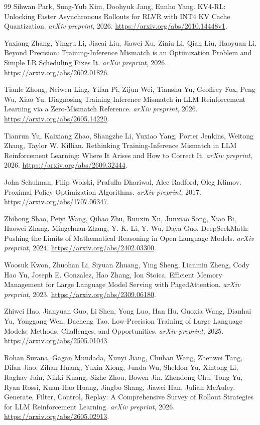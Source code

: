 \begin{thebibliography}{99}
 Sihwan Park, Sung-Yub Kim, Doohyuk Jang, Eunho Yang. KV4-RL: Unlocking Faster Asynchronous Rollouts for RLVR with INT4 KV Cache Quantization. \emph{arXiv preprint}, 2026. \url{https://arxiv.org/abs/2610.14448v1}.

 Yaxiang Zhang, Yingru Li, Jiacai Liu, Jiawei Xu, Ziniu Li, Qian Liu, Haoyuan Li. Beyond Precision: Training-Inference Mismatch is an Optimization Problem and Simple LR Scheduling Fixes It. \emph{arXiv preprint}, 2026. \url{https://arxiv.org/abs/2602.01826}.

 Tianle Zhong, Neiwen Ling, Yifan Pi, Zijun Wei, Tianshu Yu, Geoffrey Fox, Peng Wu, Xiao Yu. Diagnosing Training Inference Mismatch in LLM Reinforcement Learning via a Zero-Mismatch Reference. \emph{arXiv preprint}, 2026. \url{https://arxiv.org/abs/2605.14220}.

 Tianrun Yu, Kaixiang Zhao, Shangzhe Li, Yuxiao Yang, Porter Jenkins, Weitong Zhang, Taylor W. Killian. Rethinking Training-Inference Mismatch in LLM Reinforcement Learning: Where It Arises and How to Correct It. \emph{arXiv preprint}, 2026. \url{https://arxiv.org/abs/2609.32444}.

 John Schulman, Filip Wolski, Prafulla Dhariwal, Alec Radford, Oleg Klimov. Proximal Policy Optimization Algorithms. \emph{arXiv preprint}, 2017. \url{https://arxiv.org/abs/1707.06347}.

 Zhihong Shao, Peiyi Wang, Qihao Zhu, Runxin Xu, Junxiao Song, Xiao Bi, Haowei Zhang, Mingchuan Zhang, Y. K. Li, Y. Wu, Daya Guo. DeepSeekMath: Pushing the Limits of Mathematical Reasoning in Open Language Models. \emph{arXiv preprint}, 2024. \url{https://arxiv.org/abs/2402.03300}.

 Woosuk Kwon, Zhuohan Li, Siyuan Zhuang, Ying Sheng, Lianmin Zheng, Cody Hao Yu, Joseph E. Gonzalez, Hao Zhang, Ion Stoica. Efficient Memory Management for Large Language Model Serving with PagedAttention. \emph{arXiv preprint}, 2023. \url{https://arxiv.org/abs/2309.06180}.

 Zhiwei Hao, Jianyuan Guo, Li Shen, Yong Luo, Han Hu, Guoxia Wang, Dianhai Yu, Yonggang Wen, Dacheng Tao. Low-Precision Training of Large Language Models: Methods, Challenges, and Opportunities. \emph{arXiv preprint}, 2025. \url{https://arxiv.org/abs/2505.01043}.

 Rohan Surana, Gagan Mundada, Xunyi Jiang, Chuhan Wang, Zhenwei Tang, Difan Jiao, Zihan Huang, Yuxin Xiong, Junda Wu, Sheldon Yu, Xintong Li, Raghav Jain, Nikki Kuang, Sizhe Zhou, Bowen Jin, Zhendong Chu, Tong Yu, Ryan Rossi, Kuan-Hao Huang, Jingbo Shang, Jiawei Han, Julian McAuley. Generate, Filter, Control, Replay: A Comprehensive Survey of Rollout Strategies for LLM Reinforcement Learning. \emph{arXiv preprint}, 2026. \url{https://arxiv.org/abs/2605.02913}.


\end{thebibliography}
